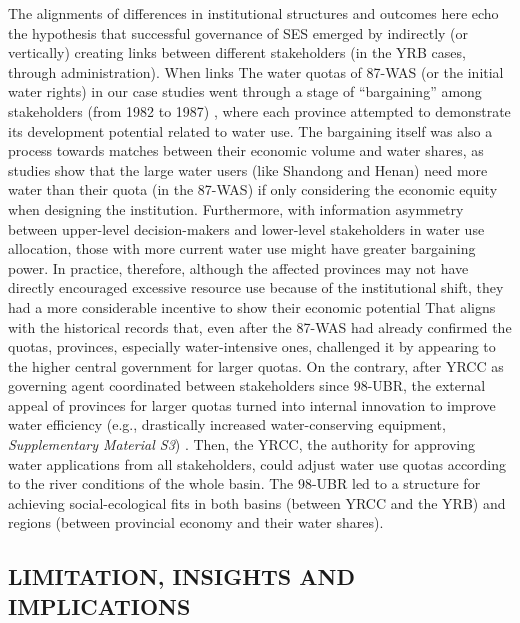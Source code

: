The alignments of differences in institutional structures and outcomes here echo the hypothesis that successful governance of SES emerged by indirectly (or vertically) creating links between different stakeholders (in the YRB cases, through administration).
When links The water quotas of 87-WAS (or the initial water rights) in our case studies went through a stage of ``bargaining'' among stakeholders (from 1982 to 1987) \cite{wang2019a, wang2019d}, where each province attempted to demonstrate its development potential related to water use.
The bargaining itself was also a process towards matches between their economic volume and water shares, as studies show that the large water users (like Shandong and Henan) need more water than their quota (in the 87-WAS) if only considering the economic equity when designing the institution.
Furthermore, with information asymmetry between upper-level decision-makers and lower-level stakeholders in water use allocation, those with more current water use might have greater bargaining power.
In practice, therefore, although the affected provinces may not have directly encouraged excessive resource use because of the institutional shift, they had a more considerable incentive to show their economic potential
That aligns with the historical records that, even after the 87-WAS had already confirmed the quotas, provinces, especially water-intensive ones, challenged it by appearing to the higher central government for larger quotas.
On the contrary, after YRCC as governing agent coordinated between stakeholders since 98-UBR, the external appeal of provinces for larger quotas turned into internal innovation to improve water efficiency (e.g., drastically increased water-conserving equipment, \textit{Supplementary Material S3})
\cite{krieger1955, ostrom1990}.
Then, the YRCC, the authority for approving water applications from all stakeholders, could adjust water use quotas according to the river conditions of the whole basin.
The 98-UBR led to a structure for achieving social-ecological fits in both basins (between YRCC and the YRB) and regions (between provincial economy and their water shares).

\subsection{LIMITATION, INSIGHTS AND IMPLICATIONS}
\label{discussion-3}

